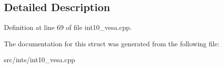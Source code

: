 \subsection{Detailed Description}


Definition at line 69 of file int10\-\_\-vesa.\-cpp.



The documentation for this struct was generated from the following file\-:\begin{DoxyCompactItemize}
\item 
src/ints/int10\-\_\-vesa.\-cpp\end{DoxyCompactItemize}
